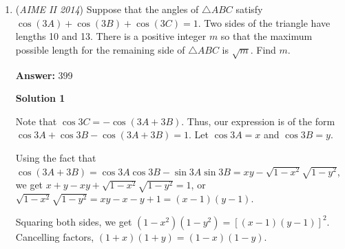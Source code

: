 \begin{enumerate}
Define the foot of the altitude from $R$ to $ED$ as $X.$ Suppose the median $EM$ is equal to $m,$ and the angle $\angle{MED}$ as $\theta.$ Using the Law of Cosines in triangle $EDM,$ we get $m^2=1+\frac{\sqrt{3}}{4}.$ By Law of Sines in $EMD,$ $\frac{m}{\sin{60^{\circ}}} = \frac{\frac{1}{2}}{\sin\theta}.$ This gives $\sin\theta = \frac{\sqrt{3}}{4m},$ and solving for $\cos\theta$ gives $\cos\theta = \sqrt{1-\frac{3}{16m^2}} = \frac{\sqrt{16m^2-3}}{4m}.$ Using the established value of $m^2,$ we have $\cos{\theta} = \frac{\sqrt{13+4\sqrt{3}}}{4m} = \frac{1+2\sqrt{3}}{4m}.$ Thus, we have $\tan\theta = \frac{\sqrt{3}}{1+2\sqrt{3}}.$ Noting that $\angle{XRC}=\theta$ as well, this gives $CX = RX \tan \theta = \frac{\sqrt{3}}{2} \cdot \frac{\sqrt{3}}{1+2\sqrt{3}} = \frac{3}{2+4\sqrt{3}}.$ Suppose $AE=n.$ Now, using Pythagorean in triangle $AXR$ gives 
 \[\left(n + \frac{\sqrt{3}}{2}\right)^2 + \frac{3}{4} = \left(n + \frac{\sqrt{3}}{2} + \frac{3}{2+4\sqrt{3}}\right)^2.\]Solving, we have
 \[\frac{3}{4} = \left(\frac{3}{2+4\sqrt{3}}\right) \left(2n + \sqrt{3} + \frac{3}{2+4\sqrt{3}}\right),\]
 \[2n + \sqrt{3} + \frac{3}{2+4\sqrt{3}} = \frac{1+2\sqrt{3}}{2},\]
 \[2n + \frac{3}{2+4\sqrt{3}} = \frac{1}{2}.\]Isolating $2n$ and rationalizing the denominator returns the final answer of $n=\frac{7-\sqrt{27}}{22},$ thus giving an answer of $\boxed{056}.$



	\item (\textit{AIME II 2014}) Suppose that the angles of $\triangle ABC$ satisfy $\cos(3A)+\cos(3B)+\cos(3C)=1$. Two sides of the triangle have lengths 10 and 13. There is a positive integer $m$ so that the maximum possible length for the remaining side of $\triangle ABC$ is $\sqrt{m}$. Find $m$. 


 
 \textbf{Answer: }399



\textbf{Solution 1}

Note that $\cos{3C}=-\cos{(3A+3B)}$. Thus, our expression is of the form $\cos{3A}+\cos{3B}-\cos{(3A+3B)}=1$. Let $\cos{3A}=x$ and $\cos{3B}=y$.

 Using the fact that $\cos(3A+3B)=\cos 3A\cos 3B-\sin 3A\sin 3B=xy-\sqrt{1-x^2}\sqrt{1-y^2}$, we get $x+y-xy+\sqrt{1-x^2}\sqrt{1-y^2}=1$, or $\sqrt{1-x^2}\sqrt{1-y^2}=xy-x-y+1=(x-1)(y-1)$. 

 Squaring both sides, we get $(1-x^2)(1-y^2) = [(x-1)(y-1)]^2$. Cancelling factors, $(1+x)(1+y) = (1-x)(1-y)$.


\end{enumerate}
